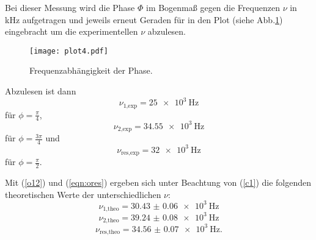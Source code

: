 Bei dieser Messung wird die Phase $\Phi$ im Bogenmaß gegen die Frequenzen $\nu$ in kHz aufgetragen
und jeweils erneut Geraden für in den Plot (siehe Abb.\ref{fig:plot4}) eingebracht um die
experimentellen $\nu$ abzulesen.
\begin{figure}
  \centering
  \texttt{[image: plot4.pdf]}
  \caption{Frequenzabhängigkeit der Phase.}
  \label{fig:plot4}
\end{figure}
Abzulesen ist dann
\begin{equation*}
  \nu_{\text{1,exp}} = \SI{25e3}{\hertz}
\end{equation*}
für $\phi = \frac{\pi}{4}$,
\begin{equation*}
  \nu_{\text{2,exp}} = \SI{34.55e3}{\hertz}
\end{equation*}
für $\phi = \frac{3\pi}{4}$ und
\begin{equation*}
  \nu_{\text{res,exp}} = \SI{32e3}{\hertz}
\end{equation*}
für $\phi = \frac{\pi}{2}$.

Mit (\ref{o12}) und (\ref{eqn:ores}) ergeben sich unter Beachtung von (\ref{c1})
die folgenden theoretischen Werte der unterschiedlichen $\nu$:
\begin{equation*}
  \nu_{\text{1,theo}} = \SI{30.43(6)e3}{\hertz}
\end{equation*}
\begin{equation*}
  \nu_{\text{2,theo}} = \SI{39.24(8)e3}{\hertz}
\end{equation*}
\begin{equation*}
  \nu_{\text{res,theo}} = \SI{34.56(7)e3}{\hertz}.
\end{equation*}







